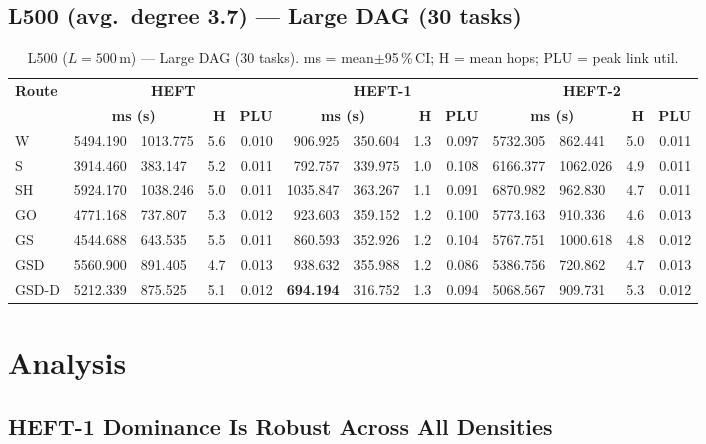 \documentclass[11pt]{article}
\newcommand{\win}[1]{\textcolor{green!50!black}{\textbf{#1}}}
\newcommand{\bad}[1]{\textcolor{red!70!black}{#1}}
\begin{document}
\subsection{L500 (avg.\ degree 3.7) --- Large DAG (30 tasks)}
\begin{table}[H]\centering\small
\begin{tabular}{l r@{$\pm$}l r r r@{$\pm$}l r r r@{$\pm$}l r r}
\toprule
\textbf{Route} & \multicolumn{4}{c}{\textbf{HEFT}} & \multicolumn{4}{c}{\textbf{HEFT-1}} & \multicolumn{4}{c}{\textbf{HEFT-2}} \\
\cmidrule(lr){2-5}\cmidrule(lr){6-9}\cmidrule(lr){10-13}
& \multicolumn{2}{c}{\textbf{ms (s)}} & \textbf{H} & \textbf{PLU}& \multicolumn{2}{c}{\textbf{ms (s)}} & \textbf{H} & \textbf{PLU}& \multicolumn{2}{c}{\textbf{ms (s)}} & \textbf{H} & \textbf{PLU} \\
\midrule
  W & 5494.190 & 1013.775 & 5.6 & 0.010 & 906.925 & 350.604 & 1.3 & 0.097 & 5732.305 & 862.441 & 5.0 & 0.011 \\
  S & 3914.460 & 383.147 & 5.2 & 0.011 & 792.757 & 339.975 & 1.0 & 0.108 & 6166.377 & 1062.026 & 4.9 & 0.011 \\
  SH & \bad{5924.170} & 1038.246 & 5.0 & 0.011 & \bad{1035.847} & 363.267 & 1.1 & 0.091 & \bad{6870.982} & 962.830 & 4.7 & 0.011 \\
  GO & 4771.168 & 737.807 & 5.3 & 0.012 & 923.603 & 359.152 & 1.2 & 0.100 & 5773.163 & 910.336 & 4.6 & 0.013 \\
  GS & 4544.688 & 643.535 & 5.5 & 0.011 & 860.593 & 352.926 & 1.2 & 0.104 & 5767.751 & 1000.618 & 4.8 & 0.012 \\
  GSD & 5560.900 & 891.405 & 4.7 & 0.013 & 938.632 & 355.988 & 1.2 & 0.086 & 5386.756 & 720.862 & 4.7 & 0.013 \\
  GSD-D & 5212.339 & 875.525 & 5.1 & 0.012 & \win{694.194} & 316.752 & 1.3 & 0.094 & 5068.567 & 909.731 & 5.3 & 0.012 \\
\bottomrule\end{tabular}
\caption{L500 ($L=500$\,m) --- Large DAG (30 tasks). ms = mean$\pm$95\,\%\,CI; H = mean hops; PLU = peak link util.}
\end{table}

\section{Analysis}

\subsection{HEFT-1 Dominance Is Robust Across All Densities}
\end{document}
